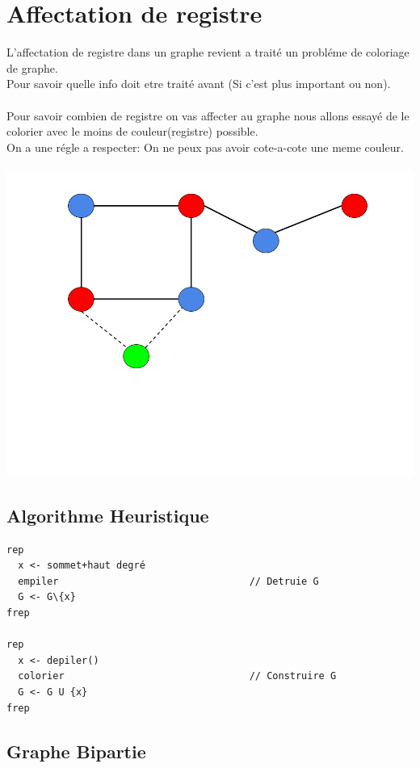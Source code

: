 \documentclass[a4paper,12pt,openany]{book}
\begin{document}
\section{Affectation de registre}

L'affectation de registre dans un graphe revient a traité un probléme de coloriage de graphe.\\
Pour savoir quelle info doit etre traité avant (Si c'est plus important ou non).\\
\\
Pour savoir combien de registre on vas affecter au graphe nous allons essayé de le colorier avec le moins de couleur(registre) possible.\\
On a une régle a respecter: On ne peux pas avoir cote-a-cote une meme couleur.\\
\\
\includegraphics[width=0.5\linewidth,center]{img/graphe-bicolore.png}


\subsection{Algorithme Heuristique}

\begin{verbatim}
rep
  x <- sommet+haut degré
  empiler                                 // Detruie G
  G <- G\{x}
frep

rep
  x <- depiler()
  colorier                                // Construire G
  G <- G U {x}
frep
\end{verbatim}


\subsection{Graphe Bipartie}
\end{document}
